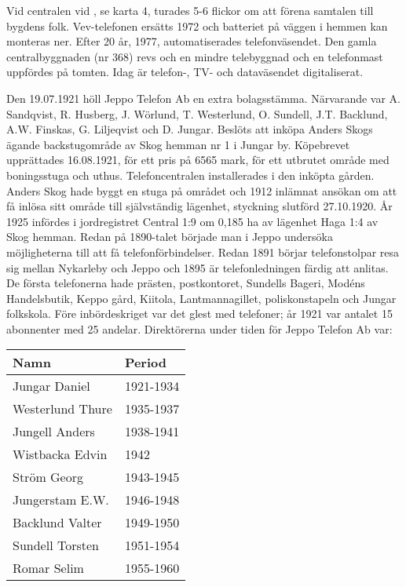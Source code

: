 Vid centralen vid , se karta 4, turades 5-6 flickor om att förena samtalen till bygdens folk.	Vev-telefonen ersätts 1972 och batteriet på väggen i hemmen kan monteras ner. Efter 20 år, 1977, automatiserades telefonväsendet. Den	gamla centralbyggnaden (nr 368) revs och en mindre telebyggnad och en telefonmast uppfördes på tomten. Idag är telefon-, TV- och dataväsendet digitaliserat.





Den 19.07.1921 höll Jeppo Telefon Ab en extra bolagsstämma.	Närvarande var A. Sandqvist, R. Husberg, J. Wörlund, T. Westerlund,	O. Sundell, J.T. Backlund, A.W. Finskas, G. Liljeqvist och D. Jungar.	Beslöts att inköpa Anders Skogs ägande backstugområde av Skog hemman nr 1 i Jungar by. Köpebrevet upprättades 16.08.1921, för ett	pris på 6565 mark, för ett utbrutet område med boningsstuga och uthus. Telefoncentralen installerades i den inköpta gården. Anders Skog hade byggt en stuga på området och 1912 inlämnat ansökan om att få inlösa sitt område till självständig lägenhet, styckning slutförd 27.10.1920. År 1925 infördes i jordregistret Central 1:9 om 0,185 ha av lägenhet Haga 1:4  av Skog hemman.
Redan på 1890-talet började man i Jeppo undersöka möjligheterna till att få telefonförbindelser. Redan 1891 börjar telefonstolpar resa sig mellan Nykarleby och Jeppo och 1895 är telefonledningen färdig att anlitas. De första telefonerna hade prästen, postkontoret, Sundells Bageri, Modéns Handelsbutik, Keppo gård, Kiitola, Lantmannagillet, poliskonstapeln och Jungar folkskola. Före inbördeskriget var det glest med telefoner; år 1921 var antalet 15 abonnenter med 25 andelar.
Direktörerna under tiden för Jeppo Telefon Ab var:
\begin{center}
  \begin{tabular}{l l}
    \hline
    Namn & Period \\ \hline
    Jungar Daniel & 1921-1934 \\
    Westerlund Thure & 1935-1937 \\
    Jungell Anders & 1938-1941 \\
    Wistbacka Edvin & 1942 \\
    Ström Georg & 1943-1945 \\
    Jungerstam E.W. & 1946-1948 \\
    Backlund Valter & 1949-1950 \\
    Sundell Torsten & 1951-1954 \\
    Romar Selim & 1955-1960 \\ \hline
  \end{tabular}
\end{center}

